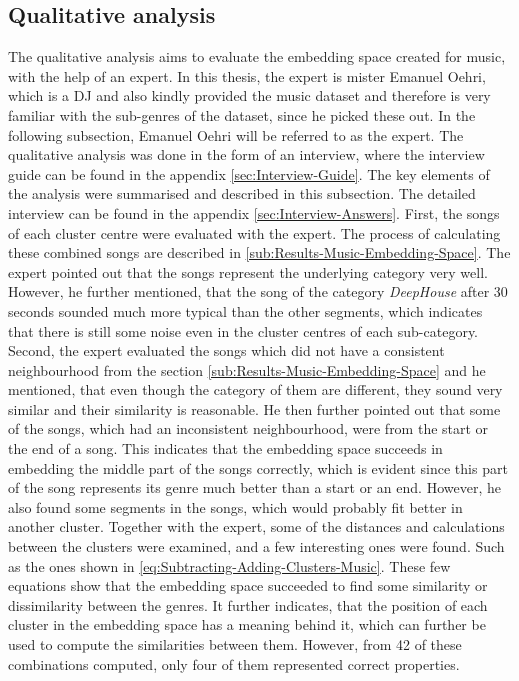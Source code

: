 \subsection{Qualitative analysis}
\label{sub:Results-Music-Qualitative-analysis}
The qualitative analysis aims to evaluate the embedding space created for music, with the help of an expert. In this thesis, the expert is mister Emanuel Oehri, which is a DJ and also kindly provided the music dataset and therefore is very familiar with the sub-genres of the dataset, since he picked these out. In the following subsection, Emanuel Oehri will be referred to as the expert. The qualitative analysis was done in the form of an interview, where the interview guide can be found in the appendix \ref{sec:Interview-Guide}. The key elements of the analysis were summarised and described in this subsection. The detailed interview can be found in the appendix \ref{sec:Interview-Answers}.
\newline
\newline
First, the songs of each cluster centre were evaluated with the expert. The process of calculating these combined songs are described in \ref{sub:Results-Music-Embedding-Space}. The expert pointed out that the songs represent the underlying category very well. However, he further mentioned, that the song of the category \textit{DeepHouse} after 30 seconds sounded much more typical than the other segments, which indicates that there is still some noise even in the cluster centres of each sub-category.
\newline
\newline
Second, the expert evaluated the songs which did not have a consistent neighbourhood from the section \ref{sub:Results-Music-Embedding-Space} and he mentioned, that even though the category of them are different, they sound very similar and their similarity is reasonable. He then further pointed out that some of the songs, which had an inconsistent neighbourhood, were from the start or the end of a song. This indicates that the embedding space succeeds in embedding the middle part of the songs correctly, which is evident since this part of the song represents its genre much better than a start or an end. However, he also found some segments in the songs, which would probably fit better in another cluster.
\newline
\newline
Together with the expert, some of the distances and calculations between the clusters were examined, and a few interesting ones were found. Such as the ones shown in \ref{eq:Subtracting-Adding-Clusters-Music}. These few equations show that the embedding space succeeded to find some similarity or dissimilarity between the genres. It further indicates, that the position of each cluster in the embedding space has a meaning behind it, which can further be used to compute the similarities between them. However, from 42 of these combinations computed, only four of them represented correct properties. 
